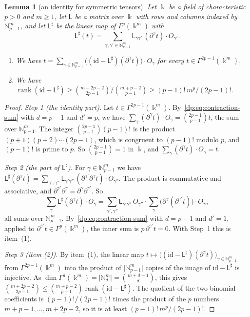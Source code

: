 \documentclass[11pt]{amsart}
\newtheorem{lemma}[theorem]{Lemma}
\theoremstyle{definition}
\theoremstyle{remark}
\numberwithin{equation}{section}
\newcommand{\N}{\mathbb N}
\newcommand{\id}{\mathrm{id}}
\newcommand{\abs}[1]{\lvert #1\rvert}
\newcommand{\rank}{\operatorname{rank}}
\theoremstyle{plain}
\theoremstyle{definition}
\theoremstyle{plain}
\begin{document}
\begin{lemma}[an identity for symmetric tensors]\label{dp:lem:linear}
Let $\Bbbk$ be a field of characteristic $p>0$ and $m\ge1$, let $\mathsf L$ be a matrix over $\Bbbk$ with rows and columns indexed by $\N^m_{p-1}$, and let $\mathsf L^\sharp$ be the linear map of $\Gamma^p(\Bbbk^m)$ with
\[
 \mathsf L^\sharp(t)=\sum_{\gamma,\gamma'\in\N^m_{p-1}}\mathsf L_{\gamma\gamma'}\,(\partial^\gamma t)\cdot O_{\gamma'}.
\]
\begin{enumerate}
\item We have $t=\sum_{\gamma\in\N^m_{p-1}}\bigl((\id-\mathsf L^\sharp)(\partial^\gamma t)\bigr)\cdot O_\gamma$ for every $t\in\Gamma^{2p-1}(\Bbbk^m)$.
\item We have $\rank(\id-\mathsf L^\sharp)\ge\binom{m+2p-2}{2p-1}\big/\binom{m+p-2}{p-1}\ge(p-1)!\,m^p/(2p-1)!$.
\end{enumerate}
\end{lemma}

\begin{proof}
\emph{Step 1 (the identity part).} Let $t\in\Gamma^{2p-1}(\Bbbk^m)$. By~\eqref{dp:eq:contraction-sum} with $d=p-1$ and $d'=p$, we have $\sum_\gamma(\partial^\gamma t)\cdot O_\gamma=\binom{2p-1}{p-1}t$, the sum over $\N^m_{p-1}$. The integer $\binom{2p-1}{p-1}(p-1)!$ is the product $(p+1)(p+2)\cdots(2p-1)$, which is congruent to $(p-1)!$ modulo $p$, and $(p-1)!$ is prime to $p$. So $\binom{2p-1}{p-1}=1$ in $\Bbbk$, and $\sum_\gamma(\partial^\gamma t)\cdot O_\gamma=t$.

\emph{Step 2 (the part of $\mathsf L^\sharp$).} For $\gamma\in\N^m_{p-1}$ we have $\mathsf L^\sharp(\partial^\gamma t)=\sum_{\gamma',\gamma''}\mathsf L_{\gamma'\gamma''}\,(\partial^{\gamma'}\partial^\gamma t)\cdot O_{\gamma''}$. The product is commutative and associative, and $\partial^{\gamma'}\partial^\gamma=\partial^\gamma\partial^{\gamma'}$. So
\[
 \sum_\gamma\mathsf L^\sharp(\partial^\gamma t)\cdot O_\gamma
 =\sum_{\gamma',\gamma''}\mathsf L_{\gamma'\gamma''}\,O_{\gamma''}\cdot
 \sum_\gamma\bigl(\partial^\gamma(\partial^{\gamma'}t)\bigr)\cdot O_\gamma,
\]
all sums over $\N^m_{p-1}$. By~\eqref{dp:eq:contraction-sum} with $d=p-1$ and $d'=1$, applied to $\partial^{\gamma'}t\in\Gamma^p(\Bbbk^m)$, the inner sum is $p\,\partial^{\gamma'}t=0$. With Step~1 this is item~(1).

\emph{Step 3 (item (2)).} By item~(1), the linear map $t\mapsto\bigl((\id-\mathsf L^\sharp)(\partial^\gamma t)\bigr)_{\gamma\in\N^m_{p-1}}$ from $\Gamma^{2p-1}(\Bbbk^m)$ into the product of $\abs{\N^m_{p-1}}$ copies of the image of $\id-\mathsf L^\sharp$ is injective. As $\dim\Gamma^d(\Bbbk^m)=\abs{\N^m_d}=\binom{m+d-1}d$, this gives $\binom{m+2p-2}{2p-1}\le\binom{m+p-2}{p-1}\rank(\id-\mathsf L^\sharp)$. The quotient of the two binomial coefficients is $(p-1)!/(2p-1)!$ times the product of the $p$ numbers $m+p-1,\dots,m+2p-2$, so it is at least $(p-1)!\,m^p/(2p-1)!$.
\end{proof}
\end{document}
